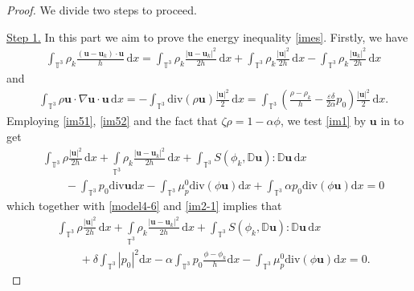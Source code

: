 \documentclass[reqno,a4paper,11pt]{amsart}
\theoremstyle{plain}
\numberwithin{equation}{section}
\begin{document}
\begin{proof} We divide two steps to proceed.
	
	
	
	\underline{Step 1.} In this part we aim to prove the energy inequality \eqref{imes}.
	Firstly, we have
	\begin{align}\label{im51}
		& \int_{\mathbb{T}^{3}} \rho_{k}\frac{(\mathbf{u}-\mathbf{u}_{k})\cdot\mathbf{u}}{h}\,\mathrm dx=\int_{\mathbb{T}^{3}} \rho_{k}\frac{|\mathbf{u}-\mathbf{u}_{k}|^{2}}{2h}\,\mathrm dx
		+\int_{\mathbb{T}^{3}} \rho_{k}\frac{|\mathbf{u}|^{2}}{2h}\,\mathrm dx-\int_{\mathbb{T}^{3}} \rho_{k}\frac{|\mathbf{u}_{k}|^{2}}{2h}\,\mathrm dx
	\end{align}
	and
	\begin{align}\label{im52}
		& \int_{\mathbb{T}^{3}} \rho\mathbf{u}\cdot\nabla\mathbf{u}\cdot\mathbf{u}\,\mathrm dx=-\int_{\mathbb{T}^{3}} \mathrm{div}(\rho\mathbf{u})\frac{|\mathbf{u}|^{2}}{2}\,\mathrm dx
		=\int_{\mathbb{T}^{3}} ( \frac{\rho-\rho_{k}}{h}-\frac{\varepsilon\delta}{2\alpha} p_{0})\frac{|\mathbf{u}|^{2}}{2}\,\mathrm dx.
	\end{align}
	Employing \eqref{im51}, \eqref{im52} and the fact that $\zeta\rho=1-\alpha\phi$, we  test \eqref{im1} by $\mathbf{u}$ in to get
	\begin{align}\label{im5}
		&\nonumber \int_{\mathbb{T}^{3}} \rho\frac{\mathbf{|u|}^{2}}{2h}\,\mathrm dx + \int\limits_{\mathbb{T}^{3}} \rho_{k}\frac{|\mathbf{u}-\mathbf{u}_{k}|^{2}}{2h}\,\mathrm dx +\int_{\mathbb{T}^{3}}S(\phi_{k},\mathbb{ D}\mathbf{u}):\mathbb{ D}\mathbf{u}\,\mathrm dx
		\\&\qquad-\int_{\mathbb{T}^{3}} p_{0}\mathrm{div}\mathbf{u}\mathrm dx -\int_{\mathbb{T}^{3}} \mu_{p}^{0}\mathrm{div}(\phi\mathbf{u})\mathrm dx
		+\int_{\mathbb{T}^{3}}\alpha p_{0}\mathrm{div}(\phi\mathbf{u})\mathrm dx=0
	\end{align}
	which together with \eqref{model4-6} and \eqref{im2-1} implies that
	\begin{align}\label{im5-1}
		&\nonumber \int_{\mathbb{T}^{3}} \rho\frac{\mathbf{|u|}^{2}}{2h}\,\mathrm dx + \int\limits_{\mathbb{T}^{3}} \rho_{k}\frac{|\mathbf{u}-\mathbf{u}_{k}|^{2}}{2h}\,\mathrm dx +\int_{\mathbb{T}^{3}}S(\phi_{k},\mathbb{ D}\mathbf{u}):\mathbb{ D}\mathbf{u}\,\mathrm dx
		\\&\qquad+\delta\int_{\mathbb{T}^{3}} |p_{0}|^2\mathrm dx -\alpha\int_{\mathbb{T}^{3}} p_{0}\frac{\phi-\phi_{k}}{h}\mathrm dx-\int_{\mathbb{T}^{3}} \mu_{p}^{0}\mathrm{div}(\phi\mathbf{u})\mathrm dx=0.
	\end{align}
	

\end{proof}
\end{document}
